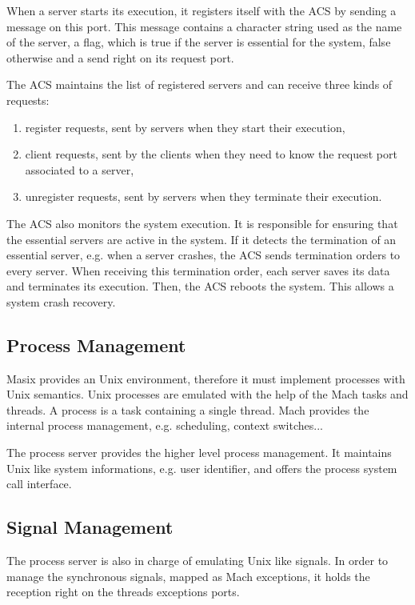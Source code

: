 	When a server starts its execution, it registers itself with
the ACS by sending a message on this port. This message contains a character
string used as the name of the server, a flag, which is true if the server is
essential for the system, false otherwise and a send right on its request port.

	The ACS maintains the list of registered servers and can receive three
kinds of requests:
\begin {enumerate}
\item register requests, sent by servers when they start their execution,
\item client requests, sent by the clients when they need to know the request
port associated to a server,
\item unregister requests, sent by servers when they terminate their
execution.
\end {enumerate}

	The ACS also monitors the system execution. It is responsible for
ensuring that the essential servers are active in the system. If it detects
the termination of an essential server, e.g. when a server crashes, the ACS
sends termination orders to every server. When receiving this termination
order, each server saves its data and terminates its execution. Then, the
ACS reboots the system. This allows a system crash recovery.

\subsection {Process Management}

	Masix provides an Unix environment, therefore it must implement
processes with Unix semantics. Unix processes are emulated with the help of
the Mach tasks and threads. A process is a task containing a single thread. Mach
provides the internal process management, e.g. scheduling, context switches...

	The process server provides the higher level process management. It
maintains Unix like system informations, e.g. user identifier, and offers
the process system call interface.

\subsection {Signal Management}

	The process server is also in charge of emulating Unix like signals.
In order to manage the synchronous signals, mapped as Mach exceptions, it
holds the reception right on the threads exceptions ports.

